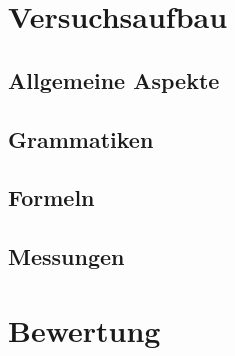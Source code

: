 \documentclass[ngerman,a4paper,abstracton,open=right,twoside=false,toc=listofnumbered]{scrreprt}
\begin{document}
\chapter{Versuchsaufbau}
\section{Allgemeine Aspekte}
\section{Grammatiken}
\section{Formeln}
\section{Messungen}

\chapter{Bewertung}

\appendix
\listoffigures %
\end{document}
